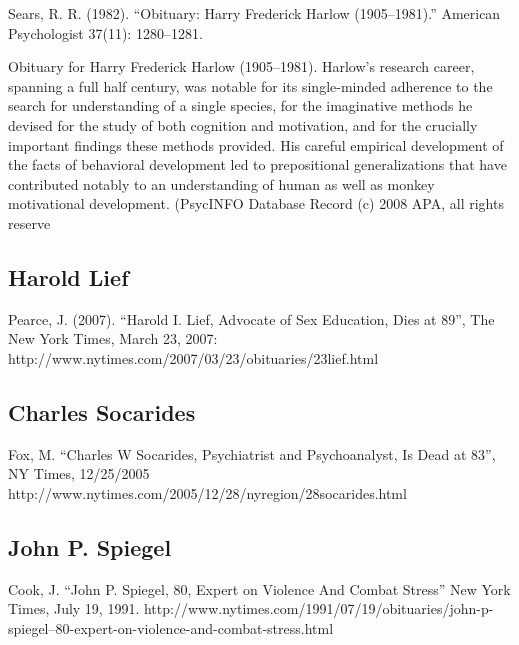 \begin{refsection}
\begin{appendices}
Sears, R. R. (1982). ``Obituary: Harry Frederick Harlow (1905--1981).'' American Psychologist 37(11): 1280--1281. 

Obituary for Harry Frederick Harlow (1905--1981). Harlow's research career, spanning a full half century, was notable for its single-minded adherence to the search for understanding of a single species, for the imaginative methods he devised for the study of both cognition and motivation, and for the crucially important findings these methods provided. His careful empirical development of the facts of behavioral development led to prepositional generalizations that have contributed notably to an understanding of human as well as monkey motivational development. (PsycINFO Database Record (c) 2008 APA, all rights reserve 

\subsection{Harold Lief}
\label{haroldlief}

Pearce, J. (2007). ``Harold I. Lief, Advocate of Sex Education, Dies at 89'', The New York Times, March 23, 2007: http:\slash \slash www.nytimes.com\slash 2007\slash 03\slash 23\slash obituaries\slash 23lief.html 

\subsection{Charles Socarides}
\label{charlessocarides}

Fox, M. ``Charles W Socarides, Psychiatrist and Psychoanalyst, Is Dead at 83'', NY Times, 12\slash 25\slash 2005 http:\slash \slash www.nytimes.com\slash 2005\slash 12\slash 28\slash nyregion\slash 28socarides.html

\subsection{John P. Spiegel}
\label{johnp.spiegel}

Cook, J. ``John P. Spiegel, 80, Expert on Violence And Combat Stress'' New York Times, July 19, 1991. http:\slash \slash www.nytimes.com\slash 1991\slash 07\slash 19\slash obituaries\slash john-p-spiegel--80-expert-on-violence-and-combat-stress.html

\end{appendices}
\end{refsection}

\pagebreak 

 
\frontmatter
\tableofcontents
\newpage
\listoftables
\newpage
\listoffigures
\newpage

